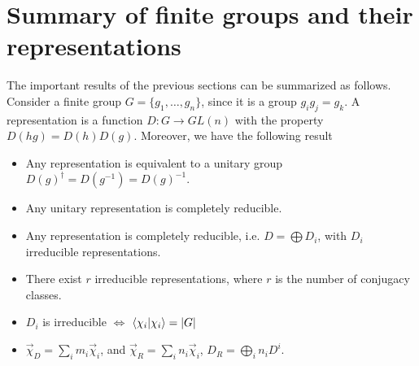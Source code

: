 \documentclass[12pt]{book}
\theoremstyle{plain}
\theoremstyle{definition}
\theoremstyle{remark}
\begin{document}
\section{Summary of finite groups and their representations}
The important results of the previous sections can be summarized as follows.\\
Consider a finite group $G =\{g_1,\dots,g_n\}$, since it is a group $g_ig_j = g_k$. A representation is a function $D:G\to GL(n)$ with the property $D(hg) = D(h)D(g)$. Moreover, we have the following result
\begin{itemize}
\item Any representation is equivalent to a unitary group $D(g)^\dagger = D(g^{-1}) = D(g)^{-1}$.
\item Any unitary representation is completely reducible.
\item Any representation is completely reducible, i.e. $D = \bigoplus D_i$, with $D_i$ irreducible representations. 
\item There exist $r$ irreducible representations, where $r$ is the number of conjugacy classes.
\item $D_i$ is irreducible $\iff$ $\braket{\chi_i|\chi_i} = |G|$
\item $\overrightarrow{\chi}_D  =\sum_i m_i \overrightarrow{\chi}_i$, and $\overrightarrow{\chi}_R  =\sum_i n_i \overrightarrow{\chi}_i$, $D_R = \bigoplus_i n_i D^i$.
\end{itemize}
\end{document}

